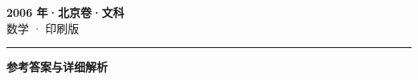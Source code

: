 \documentclass[zihao=5, a4paper]{ctexart}
\begin{document}
\begin{center}
  {\Large\bfseries 2006 年·北京卷·文科}\\[4pt]
  {\large 数学 · 印刷版}
\end{center}
\medskip
{}

\par\bigskip\hrule\bigskip
{}
\begin{center}{\large\bfseries 参考答案与详细解析}\end{center}
\smallskip

\end{document}
